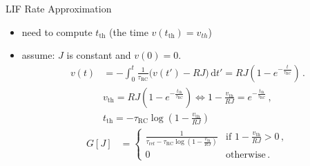 \documentclass[handout,aspectratio=169]{beamer}
\begin{document}
\begin{frame}{LIF Rate Approximation}
	\begin{itemize}
		\item need to compute $t_\mathrm{th}$ (the time $v(t_\mathrm{th})=v_{th}$)
		\item assume: $J$ is constant and $v(0) = 0$. 
		\begin{align*}
			v(t) &= - \int_0^t \frac{1}{\tau_\mathrm{RC}} \big( v(t') - RJ \big) \,\mathrm{d}t'
			= RJ \left(1 - e^{-\frac{t}{\tau_\mathrm{RC}}} \right) \,.
		\end{align*}
		\begin{align*}
			v_\mathrm{th} = RJ \left(1 - e^{-\frac{t_\mathrm{th}}{\tau_\mathrm{RC}}} \right) 
			\Leftrightarrow 1 - \frac{v_\mathrm{th}}{RJ} = e^{-\frac{t_\mathrm{th}}{\tau_\mathrm{RC}}} \,, \\
			t_\mathrm{th} = - \tau_\mathrm{RC} \log \left( 1 - \frac{v_\mathrm{th}}{RJ} \right)
		\end{align*}
	\begin{align*}
		G[J]
		&= \begin{cases}
			\frac{1}{\tau_\mathrm{ref} - \tau_\mathrm{RC} \log \left( 1 - \frac{v_\mathrm{th}}{RJ} \right)} & \text{if } 1 - \frac{v_\mathrm{th}}{RJ} > 0 \,,\\
			0 & \mathrm{otherwise} \,.
		\end{cases}
	\end{align*}
	
	
	\end{itemize}

\end{frame}
\end{document}
